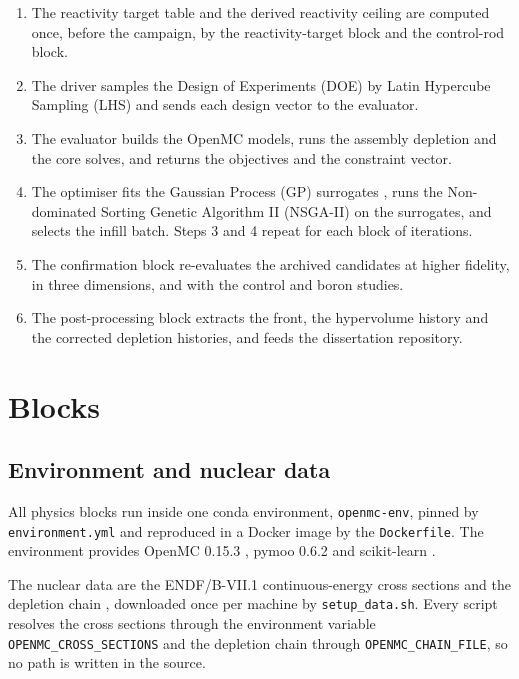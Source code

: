 \begin{enumerate}[nosep]
  \item The reactivity target table and the derived reactivity ceiling are
        computed once, before the campaign, by the reactivity-target block
        and the control-rod block.
  \item The driver samples the Design of Experiments (DOE) by Latin
        Hypercube Sampling (LHS) \cite{mckay_lhs_1979} and sends each design
        vector to the evaluator.
  \item The evaluator builds the OpenMC models, runs the assembly depletion
        and the core solves, and returns the objectives and the constraint
        vector.
  \item The optimiser fits the Gaussian Process (GP) surrogates
        \cite{rasmussen_gp_2006}, runs the Non-dominated Sorting Genetic
        Algorithm II (NSGA-II) \cite{deb_nsga2_2002} on the surrogates, and
        selects the infill batch. Steps 3 and 4 repeat for each block of
        iterations.
  \item The confirmation block re-evaluates the archived candidates at
        higher fidelity, in three dimensions, and with the control and boron
        studies.
  \item The post-processing block extracts the front, the hypervolume
        history and the corrected depletion histories, and feeds the
        dissertation repository.
\end{enumerate}

\section{Blocks}

\subsection{Environment and nuclear data}

All physics blocks run inside one conda environment, \texttt{openmc-env},
pinned by \texttt{environment.yml} and reproduced in a Docker image by the
\texttt{Dockerfile}. The environment provides OpenMC 0.15.3
\cite{romano_openmc_2015,romano_2021_depletion}, pymoo 0.6.2
\cite{blank_deb_2020} and scikit-learn \cite{pedregosa_sklearn_2011}.

The nuclear data are the ENDF/B-VII.1 continuous-energy cross sections
\cite{chadwick_endf71_2011} and the depletion chain
, downloaded once per machine by
\texttt{setup\_data.sh}. Every script resolves the cross sections through
the environment variable \texttt{OPENMC\_CROSS\_SECTIONS} and the depletion
chain through \texttt{OPENMC\_CHAIN\_FILE}, so no path is written in the
source.

